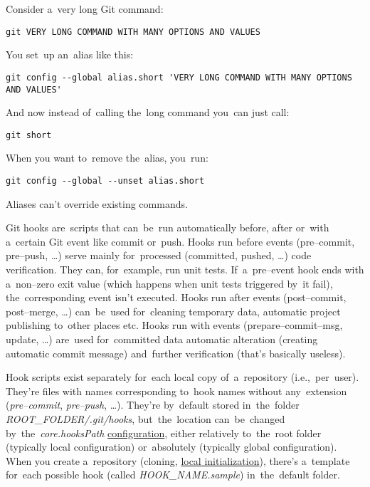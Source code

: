 \example
\noindent Consider a~very long Git command:
\begin{lstlisting}[frame=no]
    git VERY LONG COMMAND WITH MANY OPTIONS AND VALUES
\end{lstlisting}
\noindent You set~up an~alias like this:
\begin{lstlisting}[frame=no]
    git config --global alias.short 'VERY LONG COMMAND WITH MANY OPTIONS AND VALUES'
\end{lstlisting}
\noindent And now instead of~calling the~long command you~can just call:
\begin{lstlisting}[frame=no]
    git short
\end{lstlisting}
\noindent When you want to~remove the~alias, you~run:
\begin{lstlisting}[frame=no]
    git config --global --unset alias.short
\end{lstlisting}

\warning Aliases can't override existing commands.

Git hooks are~scripts that can~be~run automatically before, after or~with a~certain Git event like commit or~push. Hooks run before events (pre--commit, pre--push, \dots) serve mainly for~processed (committed, pushed, \dots) code verification. They can, for~example, run unit tests. If~a~pre--event hook ends with a~non--zero exit value (which happens when unit tests triggered by~it fail), the~corresponding event isn't executed. Hooks run after events (post--commit, post--merge, \dots) can~be~used for~cleaning temporary data, automatic project publishing to~other places etc. Hooks run with events (prepare--commit--msg, update, \dots) are~used for~committed data automatic alteration (creating automatic commit message) and~further verification (that's basically useless).

Hook scripts exist separately for~each local copy of~a~repository (i.e.,~per~user). They're files with names corresponding to~hook names without any~extension (\textit{pre--commit}, \textit{pre--push}, \dots). They're by~default stored in~the~folder \textit{ROOT\_FOLDER/.git/hooks}, but~the~location can~be~changed by~the~\textit{core.hooksPath} \hyperref[gitconfig]{configuration}, either relatively to~the~root folder (typically local configuration) or~absolutely (typically global configuration). When you create a~repository (cloning, \hyperref[initrepo]{local initialization}), there's a~template for~each possible hook (called \textit{HOOK\_NAME.sample}) in~the~default folder.


